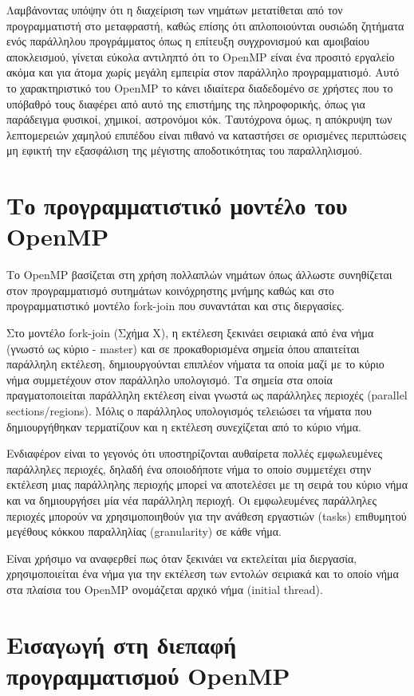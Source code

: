 Λαμβάνοντας υπόψην ότι η διαχείριση των νημάτων μετατίθεται από τον προγραμματιστή στο μεταφραστή, καθώς επίσης ότι απλοποιούνται ουσιώδη ζητήματα ενός παράλληλου προγράμματος όπως η επίτευξη συγχρονισμού και αμοιβαίου αποκλεισμού, γίνεται εύκολα αντιληπτό ότι το OpenMP είναι ένα προσιτό εργαλείο ακόμα και για άτομα χωρίς μεγάλη εμπειρία στον παράλληλο προγραμματισμό. Αυτό το χαρακτηριστικό του OpenMP το κάνει ιδιαίτερα διαδεδομένο σε χρήστες που το υπόβαθρό τους διαφέρει από αυτό της επιστήμης της πληροφορικής, όπως για παράδειγμα φυσικοί, χημικοί, αστρονόμοι κόκ. Ταυτόχρονα όμως, η απόκρυψη των λεπτομερειών χαμηλού επιπέδου είναι πιθανό να καταστήσει σε ορισμένες περιπτώσεις μη εφικτή την εξασφάλιση της μέγιστης αποδοτικότητας του παραλληλισμού.


\section{Το προγραμματιστικό μοντέλο του OpenMP}
Το OpenMP βασίζεται στη χρήση πολλαπλών νημάτων όπως άλλωστε συνηθίζεται στον προγραμματισμό συτημάτων κοινόχρηστης μνήμης καθώς και στο προγραμματιστικό μοντέλο fork-join που συναντάται και στις διεργασίες.

Στο μοντέλο fork-join (Σχήμα Χ), η εκτέλεση ξεκινάει σειριακά από ένα νήμα (γνωστό ως κύριο - master) και σε προκαθορισμένα σημεία όπου απαιτείται παράλληλη εκτέλεση, δημιουργούνται επιπλέον νήματα τα οποία μαζί με το κύριο νήμα συμμετέχουν στον παράλληλο υπολογισμό. Τα σημεία στα οποία πραγματοποιείται παράλληλη εκτέλεση είναι γνωστά ως παράλληλες περιοχές (parallel sections/regions). Μόλις ο παράλληλος υπολογισμός τελειώσει τα νήματα που δημιουργήθηκαν τερματίζουν και η εκτέλεση συνεχίζεται από το κύριο νήμα.

Ενδιαφέρον είναι το γεγονός ότι υποστηρίζονται αυθαίρετα πολλές εμφωλευμένες παράλληλες περιοχές, δηλαδή ένα οποιοδήποτε νήμα το οποίο συμμετέχει στην εκτέλεση μιας παράλληλης περιοχής μπορεί να αποτελέσει με τη σειρά του κύριο νήμα και να δημιουργήσει μία νέα παράλληλη περιοχή. Οι εμφωλευμένες παράλληλες περιοχές μπορούν να χρησιμοποιηθούν για την ανάθεση εργαστιών (tasks) επιθυμητού μεγέθους κόκκου παραλληλίας (granularity) σε κάθε νήμα.

Είναι χρήσιμο να αναφερθεί πως όταν ξεκινάει να εκτελείται μία διεργασία, χρησιμοποιείται ένα νήμα για την εκτέλεση των εντολών σειριακά και το οποίο νήμα στα πλαίσια του OpenMP ονομάζεται αρχικό νήμα (initial thread).

\section{Εισαγωγή στη διεπαφή προγραμματισμού OpenMP}

